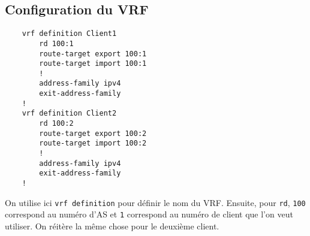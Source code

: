 \documentclass[12pt, a4paper]{article}
\begin{document}
\newpage
\subsection{Configuration du VRF}
\begin{verbatim}
    vrf definition Client1
        rd 100:1
        route-target export 100:1
        route-target import 100:1
        !
        address-family ipv4
        exit-address-family
    !
    vrf definition Client2
        rd 100:2
        route-target export 100:2
        route-target import 100:2
        !
        address-family ipv4
        exit-address-family
    !
\end{verbatim}
On utilise ici \texttt{vrf definition} pour définir le nom du VRF. 
Ensuite, pour \texttt{rd}, \texttt{100} correspond au numéro d'AS et \texttt{1}
correspond au numéro de client que l'on veut utiliser. On réitère la même 
chose pour le deuxième client.
\end{document}
